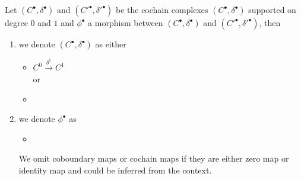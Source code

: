 \begin{definition} 
Let $(C^\bullet,\delta^\bullet)$ and $(C'^\bullet,\delta'^\bullet)$ be the cochain complexes $(C^\bullet,\delta^\bullet)$ supported on degree $0$ and $1$ and $\phi^\bullet$ a morphism between $(C^\bullet,\delta^\bullet)$ and $(C'^\bullet,\delta'^\bullet)$, then
\begin{enumerate}
\item we denote $(C^\bullet,\delta^\bullet)$ as either 
\begin{itemize}
\item $C^0 \xrightarrow{\delta^1} C^1$ \\
or  
\item {}
\end{itemize}

\item we denote $\phi^\bullet$ as 
\begin{itemize}
\item {}
\end{itemize}
We omit coboundary maps or cochain maps if they are either zero map or identity map and could be inferred from the context.
\end{enumerate}
\end{definition}

